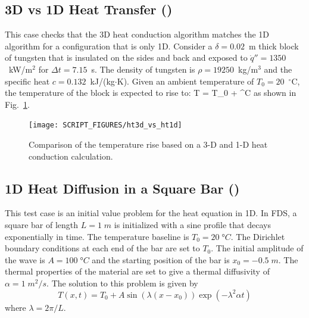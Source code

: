 \documentclass[11pt]{book}
\begin{document}
\subsection{3D vs 1D Heat Transfer (\texorpdfstring{}{ht3d\_vs\_ht1d})}
\label{ht3d_vs_ht1d}

This case checks that the 3D heat conduction algorithm matches the 1D algorithm for a configuration that is only 1D. Consider a $\delta=0.02$~m thick block of tungsten that is insulated on the sides and back and exposed to $\dot{q}''=1350$~kW/m$^2$ for $\Delta t=7.15$~s. The density of tungsten is $\rho=19250$~kg/m$^3$ and the specific heat $c=0.132$~kJ/(kg$\cdot$K). Given an ambient temperature of $T_0=20$~$^\circ$C, the temperature of the block is expected to rise to:
\be
   T = T_0 +   \; ^\circ \hbox{C}
\ee
as shown in Fig.~\ref{fig:ht3d_vs_ht1d}.

\begin{figure}[ht]
\centering
\texttt{[image: SCRIPT\_FIGURES/ht3d\_vs\_ht1d]}
\caption[The  test case]{Comparison of the temperature rise based on a 3-D and 1-D heat conduction calculation.}
\label{fig:ht3d_vs_ht1d}
\end{figure}

\FloatBarrier


\subsection{1D Heat Diffusion in a Square Bar (\texorpdfstring{}{ht3d\_nx\_x})}
\label{sec:heat_diff}
\label{ht3d_nx_10}
\label{ht3d_nx_20}
\label{ht3d_nx_40}
\label{ht3d_nx_80}
\label{ht3d_nx_160}
\label{ht3d_ny_10}
\label{ht3d_ny_20}
\label{ht3d_ny_40}
\label{ht3d_ny_80}
\label{ht3d_ny_160}
\label{ht3d_nz_10}
\label{ht3d_nz_20}
\label{ht3d_nz_40}
\label{ht3d_nz_80}
\label{ht3d_nz_160}

This test case is an initial value problem for the heat equation in 1D.  In FDS, a square bar of length $L=1\;\si{m}$ is initialized with a sine profile that decays exponentially in time.  The temperature baseline is $T_0 = 20 \;\si{\degree C}$.  The Dirichlet boundary conditions at each end of the bar are set to $T_0$.  The initial amplitude of the wave is $A = 100 \;\si{\degree C}$ and the starting position of the bar is $x_0 = -0.5 \;\si{m}$.  The thermal properties of the material are set to give a thermal diffusivity of $\alpha = 1 \;\si{m^2/s}$.  The solution to this problem is given by \cite{Crank:1}
\begin{equation}
\label{eq:expdecay}
T(x,t) = T_0 + A \sin(\lambda(x-x_0)) \exp(-\lambda^2 \alpha t)
\end{equation}
where $\lambda = 2\pi/L$.
\end{document}
